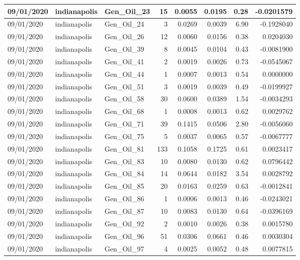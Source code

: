 \documentclass[
  letterpaper,
  DIV=11,
  numbers=noendperiod]{scrartcl}
\begin{document}
\begin{tabular}{l|l|l|r|r|r|r|r}
\hline
09/01/2020 & indianapolis & Gen\_Oil\_23 & 15 & 0.0055 & 0.0195 & 0.28 & -0.0201579\\
\hline
09/01/2020 & indianapolis & Gen\_Oil\_24 & 3 & 0.0269 & 0.0039 & 6.90 & -0.1928040\\
\hline
09/01/2020 & indianapolis & Gen\_Oil\_26 & 12 & 0.0060 & 0.0156 & 0.38 & 0.0204030\\
\hline
09/01/2020 & indianapolis & Gen\_Oil\_39 & 8 & 0.0045 & 0.0104 & 0.43 & -0.0081900\\
\hline
09/01/2020 & indianapolis & Gen\_Oil\_41 & 2 & 0.0019 & 0.0026 & 0.73 & -0.0545067\\
\hline
09/01/2020 & indianapolis & Gen\_Oil\_44 & 1 & 0.0007 & 0.0013 & 0.54 & 0.0000000\\
\hline
09/01/2020 & indianapolis & Gen\_Oil\_51 & 3 & 0.0019 & 0.0039 & 0.49 & -0.0199927\\
\hline
09/01/2020 & indianapolis & Gen\_Oil\_58 & 30 & 0.0600 & 0.0389 & 1.54 & -0.0034293\\
\hline
09/01/2020 & indianapolis & Gen\_Oil\_68 & 1 & 0.0008 & 0.0013 & 0.62 & 0.0029762\\
\hline
09/01/2020 & indianapolis & Gen\_Oil\_71 & 39 & 0.1415 & 0.0506 & 2.80 & -0.0056060\\
\hline
09/01/2020 & indianapolis & Gen\_Oil\_75 & 5 & 0.0037 & 0.0065 & 0.57 & -0.0067777\\
\hline
09/01/2020 & indianapolis & Gen\_Oil\_81 & 133 & 0.1058 & 0.1725 & 0.61 & 0.0023417\\
\hline
09/01/2020 & indianapolis & Gen\_Oil\_83 & 10 & 0.0080 & 0.0130 & 0.62 & 0.0796442\\
\hline
09/01/2020 & indianapolis & Gen\_Oil\_84 & 14 & 0.0644 & 0.0182 & 3.54 & 0.0028792\\
\hline
09/01/2020 & indianapolis & Gen\_Oil\_85 & 20 & 0.0163 & 0.0259 & 0.63 & -0.0012841\\
\hline
09/01/2020 & indianapolis & Gen\_Oil\_86 & 1 & 0.0006 & 0.0013 & 0.46 & -0.0243021\\
\hline
09/01/2020 & indianapolis & Gen\_Oil\_87 & 10 & 0.0083 & 0.0130 & 0.64 & -0.0396169\\
\hline
09/01/2020 & indianapolis & Gen\_Oil\_92 & 2 & 0.0010 & 0.0026 & 0.38 & 0.0015780\\
\hline
09/01/2020 & indianapolis & Gen\_Oil\_96 & 51 & 0.0306 & 0.0661 & 0.46 & 0.0030304\\
\hline
09/01/2020 & indianapolis & Gen\_Oil\_97 & 4 & 0.0025 & 0.0052 & 0.48 & 0.0077815\\

\end{tabular}
\end{document}
